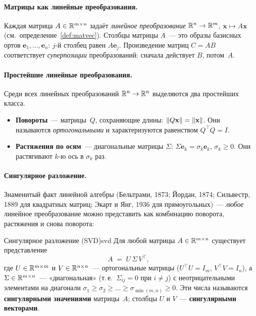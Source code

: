 \paragraph{Матрицы как линейные преобразования.}
Каждая матрица $A\in\mathbb{R}^{m\times n}$ задаёт \emph{линейное преобразование}
$\mathbb{R}^{n}\to\mathbb{R}^{m}$, $\mathbf x\mapsto A\mathbf x$ (см.\ определение~\ref{def:matvec}).
Столбцы матрицы $A$~--- это образы базисных ортов $\mathbf e_1,\dots,\mathbf e_n$:
$j$-й столбец равен $A\mathbf e_j$. Произведение матриц $C=AB$ соответствует
\emph{суперпозиции} преобразований: сначала действует $B$, потом~$A$.

\paragraph{Простейшие линейные преобразования.}
Среди всех линейных преобразований $\mathbb{R}^{n}\to\mathbb{R}^{n}$ выделяются два
простейших класса.
\begin{itemize}\itemsep1pt
  \item \textbf{Повороты}~--- матрицы~$Q$, сохраняющие длины:
        $\left\|Q\mathbf x\right\|=\left\|\mathbf x\right\|$. Они называются
        \emph{ортогональными} и характеризуются равенством $Q^{\top}Q=I$.
  \item \textbf{Растяжения по осям}~--- диагональные матрицы $\Sigma$:
        $\Sigma\mathbf e_k=\sigma_k\mathbf e_k$, $\sigma_k\geq 0$.
        Они растягивают $k$-ю ось в $\sigma_k$ раз.
\end{itemize}

\paragraph{Сингулярное разложение.}
Знаменитый факт линейной алгебры (Бельтрами, 1873; Йордан, 1874;
Сильвестр, 1889 для квадратных матриц; Экарт и Янг, 1936 для прямоугольных)~---
\emph{любое} линейное преобразование можно представить как комбинацию
поворота, растяжения и снова поворота:

\begin{theorem}{Сингулярное разложение (SVD)}{svd}
Для любой матрицы $A\in\mathbb{R}^{m\times n}$ существует представление
\begin{equation}\label{eq:svd}
\boxed{\;A\;=\;U\,\Sigma\,V^{\top},\;}
\end{equation}
где $U\in\mathbb{R}^{m\times m}$ и $V\in\mathbb{R}^{n\times n}$~--- ортогональные
матрицы ($U^{\top}U=I_m$, $V^{\top}V=I_n$), а
$\Sigma\in\mathbb{R}^{m\times n}$~--- «диагональная» (т.\,е.\ $\Sigma_{ij}=0$
при $i\neq j$) с неотрицательными элементами на диагонали
$\sigma_1\geq\sigma_2\geq\dots\geq\sigma_{\min(m,n)}\geq 0$. Эти
числа называются \textbf{сингулярными значениями} матрицы~$A$;
столбцы $U$ и $V$~--- \textbf{сингулярными векторами}.
\end{theorem}


